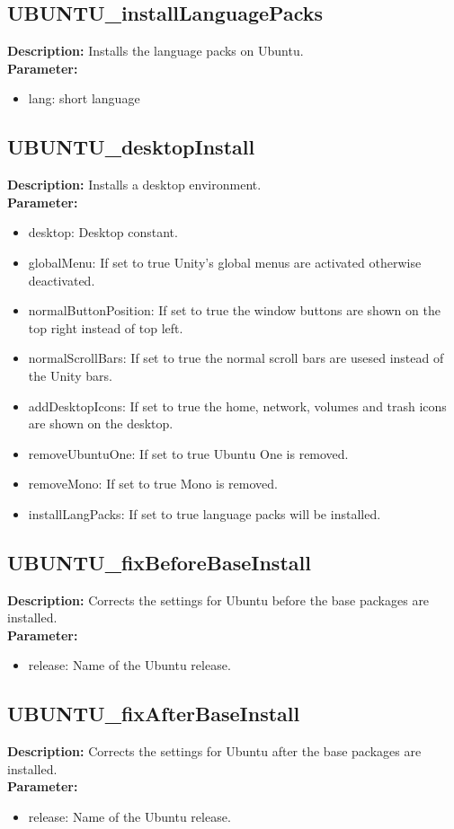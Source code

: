 \subsection{UBUNTU\_installLanguagePacks}
\textbf{Description:} Installs the language packs on Ubuntu.\\
\textbf{Parameter:}
\begin{itemize}
\item lang: short language
\end{itemize}

\subsection{UBUNTU\_desktopInstall}
\textbf{Description:} Installs a desktop environment.\\
\textbf{Parameter:}
\begin{itemize}
\item desktop: Desktop constant.
\item globalMenu: If set to true Unity's global menus are activated otherwise deactivated.
\item normalButtonPosition: If set to true the window buttons are shown on the top right instead of top left.
\item normalScrollBars: If set to true the normal scroll bars are usesed instead of the Unity bars.
\item addDesktopIcons: If set to true the home, network, volumes and trash icons are shown on the desktop.
\item removeUbuntuOne: If set to true Ubuntu One is removed.
\item removeMono: If set to true Mono is removed.
\item installLangPacks: If set to true language packs will be installed.
\end{itemize}

\subsection{UBUNTU\_fixBeforeBaseInstall}
\textbf{Description:} Corrects the settings for Ubuntu before the base packages are installed.\\
\textbf{Parameter:}
\begin{itemize}
\item release: Name of the Ubuntu release.
\end{itemize}

\subsection{UBUNTU\_fixAfterBaseInstall}
\textbf{Description:} Corrects the settings for Ubuntu after the base packages are installed.\\
\textbf{Parameter:}
\begin{itemize}
\item release: Name of the Ubuntu release.
\end{itemize}

